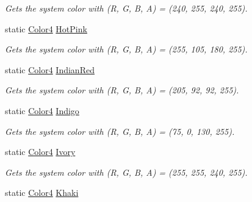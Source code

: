 \begin{DoxyCompactItemize}
\begin{DoxyCompactList}\small\item\em Gets the system color with (R, G, B, A) = (240, 255, 240, 255). \end{DoxyCompactList}\item 
static \hyperlink{struct_open_t_k_1_1_graphics_1_1_color4}{Color4} \hyperlink{struct_open_t_k_1_1_graphics_1_1_color4_a19466282837abebb6fdf0c01935cf34a}{Hot\-Pink}
\begin{DoxyCompactList}\small\item\em Gets the system color with (R, G, B, A) = (255, 105, 180, 255). \end{DoxyCompactList}\item 
static \hyperlink{struct_open_t_k_1_1_graphics_1_1_color4}{Color4} \hyperlink{struct_open_t_k_1_1_graphics_1_1_color4_ad01acd99183b4f512489304859408528}{Indian\-Red}
\begin{DoxyCompactList}\small\item\em Gets the system color with (R, G, B, A) = (205, 92, 92, 255). \end{DoxyCompactList}\item 
static \hyperlink{struct_open_t_k_1_1_graphics_1_1_color4}{Color4} \hyperlink{struct_open_t_k_1_1_graphics_1_1_color4_adcc36ceca745a7c2fe795e3e8e894ca6}{Indigo}
\begin{DoxyCompactList}\small\item\em Gets the system color with (R, G, B, A) = (75, 0, 130, 255). \end{DoxyCompactList}\item 
static \hyperlink{struct_open_t_k_1_1_graphics_1_1_color4}{Color4} \hyperlink{struct_open_t_k_1_1_graphics_1_1_color4_acca0dbc308fc42fc08d40b0593f0df2c}{Ivory}
\begin{DoxyCompactList}\small\item\em Gets the system color with (R, G, B, A) = (255, 255, 240, 255). \end{DoxyCompactList}\item 
static \hyperlink{struct_open_t_k_1_1_graphics_1_1_color4}{Color4} \hyperlink{struct_open_t_k_1_1_graphics_1_1_color4_a22317d6aa03234992d80a41cf9bc99d3}{Khaki}

\end{DoxyCompactItemize}
